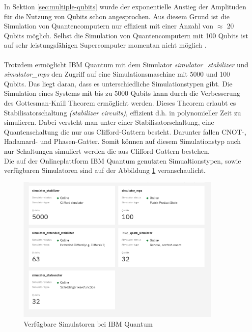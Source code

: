 In Sektion \ref{sec:multiple-qubits} wurde der exponentielle Anstieg der Amplituden f\"ur die Nutzung von Qubits schon angesprochen. Aus diesem Grund ist die Simulation von Quantencomputern nur effizient mit einer Anzahl von $\approx$ 20 Qubits m\"oglich. Selbst die Simulation von Quantencomputern mit 100 Qubits ist auf sehr leistungsf\"ahigen Supercomputer momentan nicht m\"oglich \cite{Qiskit-Textbook}. \\\\
Trotzdem erm\"oglicht IBM Quantum mit dem Simulator \textit{simulator_stabilizer} und \textit{simulator_mps} den Zugriff auf eine Simulationsmaschine mit 5000 und 100 Qubits. Das liegt daran, dass es unterschiedliche Simulationstypen gibt. Die Simulation eines Systems mit bis zu 5000 Qubits kann durch die Verbesserung des Gottesman-Knill Theorem \cite{Aaronson_2004} erm\"oglicht werden. Dieses Theorem erlaubt es Stabilisatorschaltung \textit{(stabilizer circuits)}, effizient d.h. in polynomieller Zeit zu simulieren. Dabei versteht man unter einer Stabilisatorschaltung, eine Quantenschaltung die nur aus Clifford-Gattern besteht. Darunter fallen CNOT-, Hadamard- und Phasen-Gatter. Somit k\"onnen auf diesem Simulationstyp auch nur Schaltungen simuliert werden die aus Clifford-Gattern bestehen.\\
Die auf der Onlineplattform IBM Quantum genutzten Simualtionstypen, sowie verf\"ugbaren Simulatoren sind auf der Abbildung \ref{fig:simulated-services} veranschaulicht. 
\begin{figure}
\centering
\includegraphics[width=0.9\textwidth]{figures/simulation_services.png}
\caption{Verf\"ugbare Simulatoren bei IBM Quantum}
\label{fig:simulated-services}
\end{figure}

